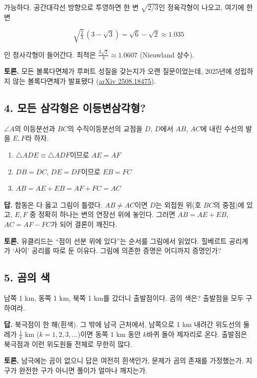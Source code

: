 가능하다. 공간대각선 방향으로 투영하면 한 변 \(\sqrt{2/3}\)인 정육각형이
나오고, 여기에 한 변

\[
\sqrt{\tfrac23}\,(3-\sqrt3)=\sqrt6-\sqrt2\approx1.035
\]

인 정사각형이 들어간다. 최적은 \(\tfrac{3\sqrt2}{4}\approx1.0607\)
(Nieuwland 상수).

\textbf{토론.} 모든 볼록다면체가 루퍼트 성질을 갖는지가 오랜
질문이었는데, 2025년에 성립하지 않는 볼록다면체가 발표됐다
(\href{https://arxiv.org/abs/2508.18475}{arXiv 2508.18475}).

\subsection{4. 모든 삼각형은 이등변삼각형?}

\(\angle A\)의 이등분선과 \(BC\)의 수직이등분선의 교점을 \(D\),
\(D\)에서 \(AB\), \(AC\)에 내린 수선의 발을 \(E,F\)라 하자.

\begin{enumerate}
\def\labelenumi{\arabic{enumi}.}
\tightlist
\item
  \(\triangle ADE\equiv\triangle ADF\)이므로 \(AE=AF\)
\item
  \(DB=DC\), \(DE=DF\)이므로 \(EB=FC\)
\item
  \(AB=AE+EB=AF+FC=AC\)
\end{enumerate}

\textbf{답.} 합동은 다 옳고 그림이 틀렸다. \(AB\ne AC\)이면 \(D\)는
외접원 위(호 \(BC\)의 중점)에 있고, \(E,F\) 중 정확히 하나는 변의 연장선
위에 놓인다. 그러면 \(AB=AE+EB\), \(AC=AF-FC\)가 되어 결론이 깨진다.

\textbf{토론.} 유클리드는 ``점이 선분 위에 있다''는 순서를 그림에서
읽었다. 힐베르트 공리계가 `사이' 공리를 따로 둔 이유다. 그림에 의존한
증명은 어디까지 증명인가?

\subsection{5. 곰의 색}

남쪽 1 km, 동쪽 1 km, 북쪽 1 km를 갔더니 출발점이다. 곰의 색은? 출발점을
모두 구하여라.

\textbf{답.} 북극점이 한 해(흰색). 그 밖에 남극 근처에서, 남쪽으로 1 km
내려간 위도선의 둘레가 \(\tfrac1k\) km (\(k=1,2,3,\dots\))이면 동쪽 1 km
동안 \(k\)바퀴 돌아 제자리로 온다. 출발점은 북극점과 이런 위도원들
전체로 무한히 많다.

\textbf{토론.} 남극에는 곰이 없으니 답은 여전히 흰색인가, 문제가 곰의
존재를 가정했는가. 지구가 완전한 구가 아니면 풀이가 얼마나 깨지는가.
